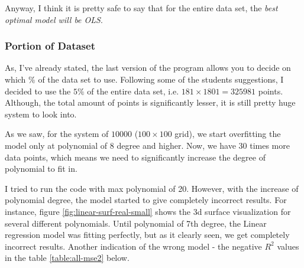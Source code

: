 Anyway, I think it is pretty safe to say that for the entire data set, the \textit{best optimal model will be OLS}.

\subsubsection{Portion of Dataset}

As, I've already stated, the last version of the program allows you to decide on which $\%$ of the data set to use. Following some of the students suggestions, I decided to use the $5\%$ of the entire data set, i.e. $181\times1801=325981$ points. Although, the total amount of points is significantly lesser, it is still pretty huge system to look into. 

As we saw, for the system of $10000$ ($100\times100$ grid), we start overfitting the model only at polynomial of 8 degree and higher. Now, we have 30 times more data points, which means we need to significantly increase the degree of polynomial to fit in.

I tried to run the code with max polynomial of 20. However, with the increase of polynomial degree, the model started to give completely incorrect results. For instance, figure \ref{fig:linear-surf-real-small} shows the 3d surface visualization for several different polynomials. Until polynomial of 7th degree, the Linear regression model was fitting perfectly, but as it clearly seen, we get completely incorrect results. Another indication of the wrong model - the negative $R^2$ values in the table \ref{table:all-mse2} below.

